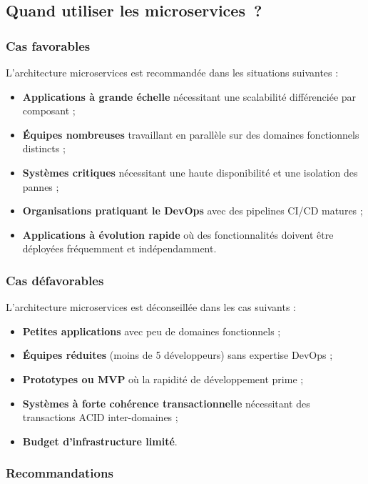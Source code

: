 \documentclass[12pt,a4paper]{article}
\begin{document}
\subsection{Quand utiliser les microservices~?}

\subsubsection{Cas favorables}

L'architecture microservices est recommandée dans les situations suivantes :
\begin{itemize}
    \item \textbf{Applications à grande échelle} nécessitant une scalabilité différenciée par composant ;
    \item \textbf{Équipes nombreuses} travaillant en parallèle sur des domaines fonctionnels distincts ;
    \item \textbf{Systèmes critiques} nécessitant une haute disponibilité et une isolation des pannes ;
    \item \textbf{Organisations pratiquant le DevOps} avec des pipelines CI/CD matures ;
    \item \textbf{Applications à évolution rapide} où des fonctionnalités doivent être déployées fréquemment et indépendamment.
\end{itemize}

\subsubsection{Cas défavorables}

L'architecture microservices est déconseillée dans les cas suivants :
\begin{itemize}
    \item \textbf{Petites applications} avec peu de domaines fonctionnels ;
    \item \textbf{Équipes réduites} (moins de 5 développeurs) sans expertise DevOps ;
    \item \textbf{Prototypes ou MVP} où la rapidité de développement prime ;
    \item \textbf{Systèmes à forte cohérence transactionnelle} nécessitant des transactions ACID inter-domaines ;
    \item \textbf{Budget d'infrastructure limité}.
\end{itemize}

\subsubsection{Recommandations}
\end{document}
